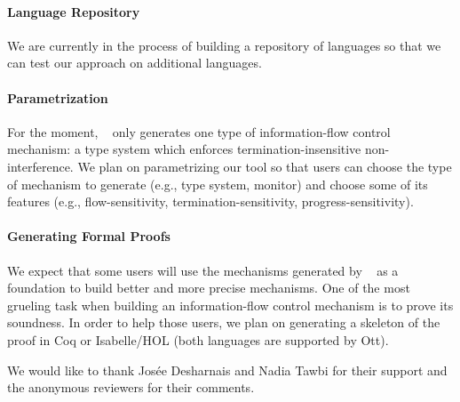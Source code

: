 \documentclass[sigplan,10pt]{acmart}\settopmatter{printfolios=true,printccs=false,printacmref=false}
\begin{document}
\paragraph{Language Repository} We are currently in the process of building a repository of languages so that we can test our approach on additional languages. 

\paragraph{Parametrization} For the moment, \ottifc~ only generates one type of information-flow control mechanism: a type system which enforces termination-insensitive non-interference. We plan on parametrizing our tool so that users can choose the type of mechanism to generate (e.g., type system, monitor) and choose some of its features (e.g., flow-sensitivity, termination-sensitivity, progress-sensitivity).

\paragraph{Generating Formal Proofs} We expect that some users will use the mechanisms generated by \ottifc~ as a foundation to build better and more precise mechanisms. One of the most grueling task when building an information-flow control mechanism is to prove its soundness. In order to help those users, we plan on generating a skeleton of the proof in Coq or Isabelle/HOL (both languages are supported by Ott).

\begin{acks}
We would like to thank Josée Desharnais and Nadia Tawbi for their support and the anonymous reviewers for their comments.
\end{acks}


\end{document}
